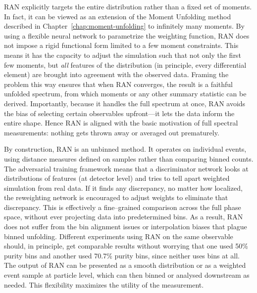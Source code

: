         RAN explicitly targets the entire distribution rather than a fixed set of moments.
        In fact, it can be viewed as an extension of the Moment Unfolding method described in Chapter~\ref{chap:moment-unfolding} to infinitely many moments.
        By using a flexible neural network to parametrize the weighting function, RAN does not impose a rigid functional form limited to a few moment constraints.
        This means it has the capacity to adjust the simulation such that not only the first few moments, but \emph{all} features of the distribution (in principle, every differential element) are brought into agreement with the observed data.
        Framing the problem this way ensures that when RAN converges, the result is a faithful unfolded spectrum, from which moments or any other summary statistic can be derived.
        Importantly, because it handles the full spectrum at once, RAN avoids the bias of selecting certain observables upfront---it lets the data inform the entire shape. 
        Hence RAN is aligned with the basic motivation of full spectral measurements: nothing gets thrown away or averaged out prematurely.

        By construction, RAN is an unbinned method.
        It operates on individual events, using distance measures defined on samples rather than comparing binned counts.
        The adversarial training framework means that a discriminator network looks at distributions of features (at detector level) and tries to tell apart weighted simulation from real data.
        If it finds any discrepancy, no matter how localized, the reweighting network is encouraged to adjust weights to eliminate that discrepancy.
        This is effectively a fine--grained comparison across the full phase space, without ever projecting data into predetermined bins.
        As a result, RAN does not suffer from the bin alignment issues or interpolation biases that plague binned unfolding.
        Different experiments using RAN on the same observable should, in principle, get comparable results without worrying that one used 50\% purity bins and another used 70.7\% purity bins, since neither uses bins at all.
        The output of RAN can be presented as a smooth distribution or as a weighted event sample at particle level, which can then binned or analysed downstream as needed.
        This flexibility maximizes the utility of the measurement.

